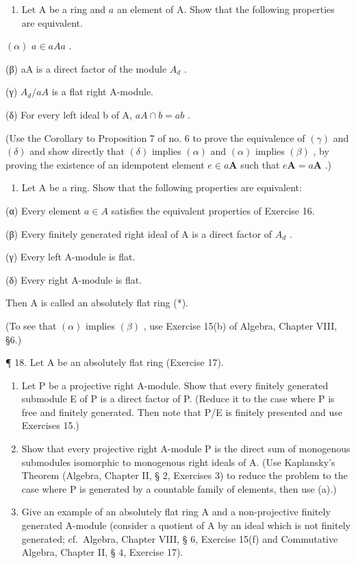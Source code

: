 \begin{enumerate}
\def\labelenumi{\arabic{enumi}.}
\setcounter{enumi}{15}
\tightlist
\item
  Let A be a ring and \(a\) an element of A. Show that the following properties are equivalent.
\end{enumerate}

\((\alpha)\) \(a \in aAa\) .

(β) aA is a direct factor of the module \(A_{d}\) .

(γ) \(A_{d}/aA\) is a flat right A-module.

(δ) For every left ideal b of A, \(aA \cap b = ab\) .

(Use the Corollary to Proposition 7 of no. 6 to prove the equivalence of \((\gamma)\) and \((\delta)\) and show directly that \((\delta)\) implies \((\alpha)\) and \((\alpha)\) implies \((\beta)\) , by proving the existence of an idempotent element \(e \in a\mathbf{A}\) such that \(e\mathbf{A} = a\mathbf{A}\) .)

\begin{enumerate}
\def\labelenumi{\arabic{enumi}.}
\setcounter{enumi}{16}
\tightlist
\item
  Let A be a ring. Show that the following properties are equivalent:
\end{enumerate}

(α) Every element \(a \in A\) satisfies the equivalent properties of Exercise 16.

(β) Every finitely generated right ideal of A is a direct factor of \(A_{d}\) .

(γ) Every left A-module is flat.

(δ) Every right A-module is flat.

Then A is called an absolutely flat ring (*).

(To see that \((\alpha)\) implies \((\beta)\) , use Exercise 15(b) of Algebra, Chapter VIII, §6.)

¶ 18. Let A be an absolutely flat ring (Exercise 17).

\begin{enumerate}
\def\labelenumi{(\alph{enumi})}
\item
  Let P be a projective right A-module. Show that every finitely generated submodule E of P is a direct factor of P. (Reduce it to the case where P is free and finitely generated. Then note that P/E is finitely presented and use Exercises 15.)
\item
  Show that every projective right A-module P is the direct sum of monogenous submodules isomorphic to monogenous right ideals of A. (Use Kaplansky's Theorem (Algebra, Chapter II, § 2, Exercises 3) to reduce the problem to the case where P is generated by a countable family of elements, then use (a).)
\item
  Give an example of an absolutely flat ring A and a non-projective finitely generated A-module (consider a quotient of A by an ideal which is not finitely generated; cf.~Algebra, Chapter VIII, § 6, Exercise 15(f) and Commutative Algebra, Chapter II, § 4, Exercise 17).
\end{enumerate}

